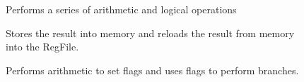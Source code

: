\documentclass[11pt]{article}
\begin{document}
\begin{center}
\begin{figure}
\caption{Performs a series of arithmetic and logical operations}
\label{fig:p2}
\end{figure} 
\end{center}

\begin{center}
\begin{figure}
\caption{Stores the result into memory and reloads the result from memory into the RegFile. }
\label{fig:p3}
\end{figure} 
\end{center}

\begin{center}
\begin{figure}
\caption{Performs arithmetic to set flags and uses flags to perform branches.}
\label{fig:p4}
\end{figure} 
\end{center}
\end{document}
